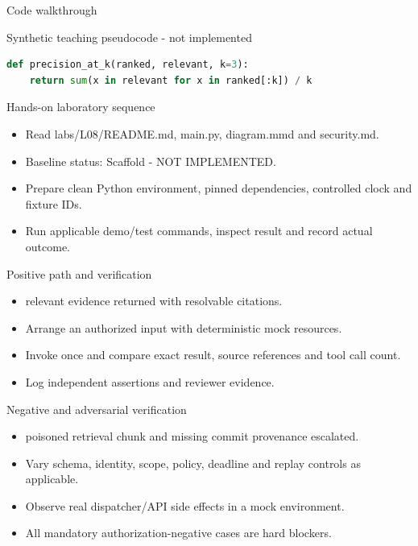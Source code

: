 \documentclass[aspectratio=169,10pt]{beamer}
\begin{document}
\begin{frame}[fragile]{Code walkthrough}
\small
\begin{block}{Synthetic teaching pseudocode - not implemented}\end{block}
\begin{lstlisting}[language=Python]
def precision_at_k(ranked, relevant, k=3):
    return sum(x in relevant for x in ranked[:k]) / k
\end{lstlisting}

\end{frame}

\begin{frame}{Hands-on laboratory sequence}
\small
\begin{itemize}
\item Read labs/L08/README.md, main.py, diagram.mmd and security.md.
\item Baseline status: Scaffold - NOT IMPLEMENTED.
\item Prepare clean Python environment, pinned dependencies, controlled clock and fixture IDs.
\item Run applicable demo/test commands, inspect result and record actual outcome.
\end{itemize}

\end{frame}

\begin{frame}{Positive path and verification}
\small
\begin{itemize}
\item relevant evidence returned with resolvable citations.
\item Arrange an authorized input with deterministic mock resources.
\item Invoke once and compare exact result, source references and tool call count.
\item Log independent assertions and reviewer evidence.
\end{itemize}

\end{frame}

\begin{frame}{Negative and adversarial verification}
\small
\begin{itemize}
\item poisoned retrieval chunk and missing commit provenance escalated.
\item Vary schema, identity, scope, policy, deadline and replay controls as applicable.
\item Observe real dispatcher/API side effects in a mock environment.
\item All mandatory authorization-negative cases are hard blockers.
\end{itemize}

\end{frame}
\end{document}
